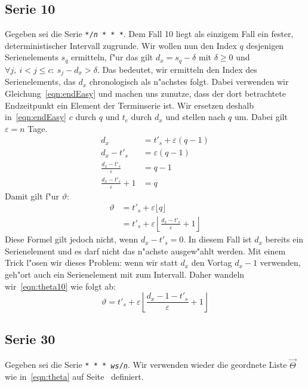 \documentclass[a4paper]{article}
\numberwithin{equation}{section}
\begin{document}
\subsection{Serie 10}
Gegeben sei die Serie \texttt{*/\textit{n} * * *}. Dem Fall 10 liegt als
einzigem Fall ein fester, deterministischer Intervall zugrunde. Wir wollen nun
den Index $q$ desjenigen Serienelements $s_q$ ermitteln, f"ur das gilt
$d_x = s_q - \delta$ mit $\delta \ge 0$ und
$\forall j,\ i < j \le c :\ s_j - d_x > \delta$. Das bedeutet, wir ermitteln den
Index des Serienelements, das $d_x$ chronologisch als n"achstes folgt. Dabei
verwenden wir Gleichung~\eqref{eqn:endEasy} und machen uns zunutze, dass der
dort betrachtete Endzeitpunkt ein Element der Terminserie ist. Wir ersetzen
deshalb in~\eqref{eqn:endEasy} $c$ durch $q$ und $t_e$ durch $d_x$ und stellen
nach $q$ um. Dabei gilt $\varepsilon = n$ Tage.
\begin{equation}\label{eqn:qFromEpsilon}
\begin{split}
  d_x & = t'_s + \varepsilon(q - 1) \\
  d_x - t'_s & = \varepsilon(q - 1) \\
  \frac{d_x - t'_s}{\varepsilon} & = q - 1 \\
  \frac{d_x - t'_s}{\varepsilon} + 1 & = q
\end{split}
\end{equation}
Damit gilt f"ur $\vartheta$:
\begin{equation}\label{eqn:theta10}
\begin{split}
  \vartheta & = t'_s + \varepsilon\lfloor q\rfloor \\
  & = t'_s + \varepsilon\left\lfloor \frac{d_x - t'_s}{\varepsilon} +
    1\right\rfloor
\end{split}
\end{equation}
Diese Formel gilt jedoch nicht, wenn $d_x - t'_s = 0$. In diesem Fall ist $d_x$
bereits ein Serienelement und es darf nicht das n"achste ausgew"ahlt werden.
Mit einem Trick l"osen wir dieses Problem: wenn wir statt $d_x$ den Vortag
$d_x - 1$ verwenden, geh"ort auch ein Serienelement mit zum Intervall. Daher
wandeln wir~\eqref{eqn:theta10} wie folgt ab:
\begin{equation}
  \vartheta = t'_s + \varepsilon\left\lfloor
    \frac{d_x - 1 - t'_s}{\varepsilon} + 1\right\rfloor
\end{equation}


%
%
\subsection{Serie 30}
Gegeben sei die Serie \texttt{* * * \textit{ws}/\textit{n}}. Wir verwenden
wieder die geordnete Liste $\vec{\Theta}$ wie in~\eqref{eqn:theta} auf
Seite~\pageref{eqn:theta} definiert.
\end{document}

